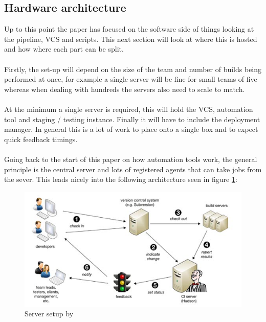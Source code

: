 \subsection{Hardware architecture}

Up to this point the paper has focused on the software side of things looking at the pipeline, VCS and scripts. This next section will look at where this is hosted and how where each part can be split.  
\\\\
Firstly, the set-up will depend on the size of the team and number of builds being performed at once, for example a single server will be fine for small teams of five whereas when dealing with hundreds the servers also need to scale to match.
\\\\
At the minimum a single server is required, this will hold the VCS, automation tool and staging / testing instance. Finally it will have to include the deployment manager. In general this is a lot of work to place onto a single box and to expect quick feedback timings.
\\\\
Going back to the start of this paper on how automation tools work, the general principle is the central server and lots of registered agents that can take jobs from the sever. This leads nicely into the following architecture seen in figure \ref{fig:bamboo}:

\begin{figure}[H]
	\centering
	\includegraphics[scale=2.5]{images/bamboo.jpg}
	\caption{Server setup by \cite{bamboo}}
	\label{fig:bamboo}
\end{figure}


